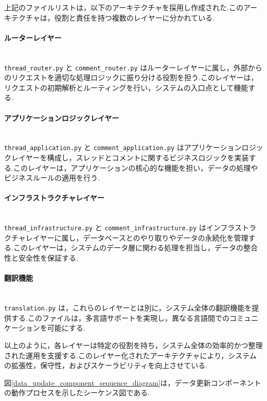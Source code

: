 \documentclass[b5paper,12pt,dvipdfmx]{jsreport}
\newcommand{\red}[1]{\textcolor{red}{#1}}
\begin{document}

上記のファイルリストは，以下のアーキテクチャを採用し作成された.このアーキテクチャは，役割と責任を持つ複数のレイヤーに分かれている.

\paragraph{ルーターレイヤー}\mbox{}\\
\texttt{thread\_router.py} と \texttt{comment\_router.py} はルーターレイヤーに属し，外部からのリクエストを適切な処理ロジックに振り分ける役割を担う.このレイヤーは，リクエストの初期解析とルーティングを行い，システムの入口点として機能する.

\paragraph{アプリケーションロジックレイヤー}\mbox{}\\
\texttt{thread\_application.py} と \texttt{comment\_application.py} はアプリケーションロジックレイヤーを構成し，スレッドとコメントに関するビジネスロジックを実装する.このレイヤーは，アプリケーションの核心的な機能を担い，データの処理やビジネスルールの適用を行う.

\paragraph{インフラストラクチャレイヤー}\mbox{}\\
\texttt{thread\_infrastructure.py} と \texttt{comment\_infrastructure.py} はインフラストラクチャレイヤーに属し，データベースとのやり取りやデータの永続化を管理する.このレイヤーは，システムのデータ層に関わる処理を担当し，データの整合性と安全性を保証する.

\paragraph{翻訳機能}\mbox{}\\
\texttt{translation.py} は，これらのレイヤーとは別に，システム全体の翻訳機能を提供する.このファイルは，多言語サポートを実現し，異なる言語間でのコミュニケーションを可能にする.

以上のように，各レイヤーは特定の役割を持ち，システム全体の効率的かつ整理された運用を支援する.このレイヤー化されたアーキテクチャにより，システムの拡張性，保守性，およびスケーラビリティを向上させている.


図\ref{data_update_component_sequence_diagram}は，データ更新コンポーネントの動作プロセスを示したシーケンス図である.
\end{document}
